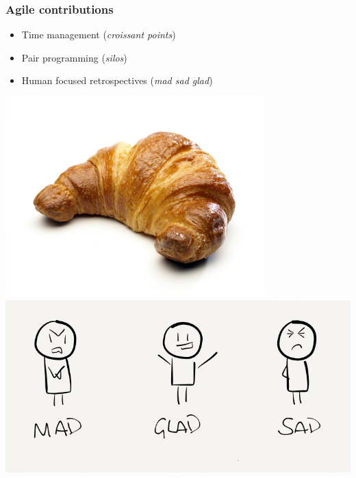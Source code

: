 \begin{FrameWithSubSection}
    \frametitle{Agile contributions}
    \begin{minipage}{0.49\textwidth}
        \begin{itemize}
            \item Time management (\emph{croissant points})
            \item Pair programming (\emph{silos})
            \item Human focused retrospectives (\emph{mad sad glad})
        \end{itemize}
    \end{minipage}
    \begin{minipage}{0.40\textwidth}
        \flushright
        \includegraphics[width=0.75\textwidth]{./img/croissant.jpg} \\
        \includegraphics[width=\textwidth]{../../report/src/img/mgs.png}
    \end{minipage}
\end{FrameWithSubSection}


